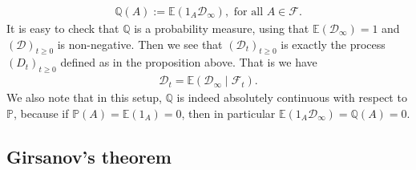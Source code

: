 \documentclass[../mainfile.tex]{subfiles}
\begin{document}
\begin{align*}
\mathbb{Q}(A):= \mathbb{E}(1_A \mathcal{D}_\infty), \text{ for all } A \in \mathcal{F}.
\end{align*} 
It is easy to check that $\mathbb{Q}$ is a probability measure, using that $\mathbb{E}(\mathcal{D}_\infty)=1$ and $(\mathcal{D})_{t \geq 0}$ is non-negative. Then we see that $( \mathcal{D}_t)_{t \geq 0}$ is exactly the process $(D_t)_{t \geq 0}$ defined as in the proposition above. That is we have
\begin{align*}
\mathcal{D}_t = \mathbb{E}( \mathcal{D}_\infty \mid \mathcal{F}_t).
\end{align*}
We also note that in this setup, $\mathbb{Q}$ is indeed absolutely continuous with respect to $\mathbb{P}$, because if $\mathbb{P}(A)= \mathbb{E}(1_A)=0$, then in particular $\mathbb{E}(1_A \mathcal{D}_\infty)= \mathbb{Q}(A)=0$. 
\newpage
\subsection{Girsanov's theorem}
\end{document}
